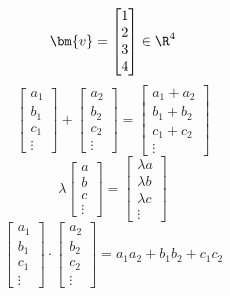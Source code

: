 \documentclass[../SOP.tex]{subfile}
\begin{document}
\begin{equation*}
  \bm{v} = \begin{bmatrix} 1 \\ 2 \\ 3 \\ 4 \end{bmatrix} \in \R^4
\end{equation*}
\begin{equation*}
  \begin{bmatrix}
    a_1 \\ b_1 \\ c_1 \\ \vdots
  \end{bmatrix}
  +
  \begin{bmatrix}
   a_2 \\ b_2 \\ c_2 \\ \vdots
  \end{bmatrix}
  =
  \begin{bmatrix}
    a_1+a_2 \\ b_1+b_2 \\ c_1+c_2 \\ \vdots
  \end{bmatrix}
\end{equation*}
\begin{equation*}
  \lambda 
  \begin{bmatrix}
    a \\ b \\ c \\ \vdots
  \end{bmatrix}
  =
  \begin{bmatrix}
    \lambda a \\ \lambda b \\ \lambda c \\ \vdots
  \end{bmatrix}
\end{equation*}
\begin{equation*}
  \begin{bmatrix}
    a_1 \\ b_1 \\ c_1 \\ \vdots
  \end{bmatrix}
  \cdot
  \begin{bmatrix}
    a_2 \\ b_2 \\ c_2 \\ \vdots
  \end{bmatrix}
  = a_1a_2 + b_1b_2 + c_1c_2
\end{equation*}
\end{document}
